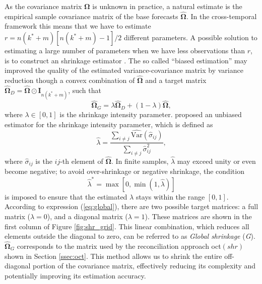 \documentclass[a4paper,11pt]{article}
\newcommand{\Ivet}{\bm{I}}
\newcommand{\Omegavet}{\bm{\Omega}}
\theoremstyle{definition}
\begin{document}
As the covariance matrix $\Omegavet$ is unknown in practice, a natural estimate is the empirical sample covariance matrix of the base forecasts $\widehat{\Omegavet}$. In the cross-temporal framework this means that we have to estimate $r = n(k^\ast+m)[n(k^\ast+m)-1]/2$ different parameters. A possible solution to estimating a large number of parameters when we have less observations than $r$, is to construct an shrinkage estimator \citep{efron1975a,efron1975,efron1977}. The so called “biased estimation” may improved the quality of the estimated variance-covariance matrix by variance reduction though a convex combination of $\widehat{\Omegavet}$ and a target matrix $\widehat{\Omegavet}_D = \widehat{\Omegavet} \odot \Ivet_{n(k^\ast+m)}$, such that
\begin{equation}\label{eq:global}
\widehat{\Omegavet}_{G} = \lambda \widehat{\Omegavet}_D + (1-\lambda) \widehat{\Omegavet},
\end{equation}
where $\lambda \in [0,1]$ is the shrinkage intensity parameter.
\cite{schafer2005} proposed an unbiased estimator for the shrinkage intensity parameter, which is defined as
$$
\widehat{\lambda}=\frac{\sum_{i \neq j} \widehat{\mathrm{Var}}(\widehat{\sigma}_{i j})}{\sum_{i \neq j} \widehat{\sigma}_{i j}^2},
$$
where $\widehat{\sigma}_{i j}$ is the $i j$-th element of $\widehat{\Omegavet}$. In finite samples, $\widehat{\lambda}$ may exceed unity or even become negative; to avoid over-shrinkage or negative shrinkage, the condition
$$
\widehat{\lambda}^\ast=\max \left[0, \min \left(1, \widehat{\lambda}\right)\right]
$$
is imposed to ensure that the estimated $\lambda$ stays within the range $[0,1]$. According to expression (\ref{eq:global}), there are two possible target matrices: a full matrix ($\lambda=0$), and a diagonal matrix ($\lambda=1$). These matrices are shown in the first column of Figure \ref{fig:shr_grid}. This linear combination, which reduces all elements outside the diagonal to zero, can be referred to as \textit{Global shrinkage} (\textit{G}). $\widehat{\Omegavet}_{G}$ corresponds to the matrix used by the reconciliation approach oct$(shr)$ shown in Section \ref{ssec:oct}. This method allows us to shrink the entire off-diagonal portion of the covariance matrix, effectively reducing its complexity and potentially improving its estimation accuracy.
\end{document}
